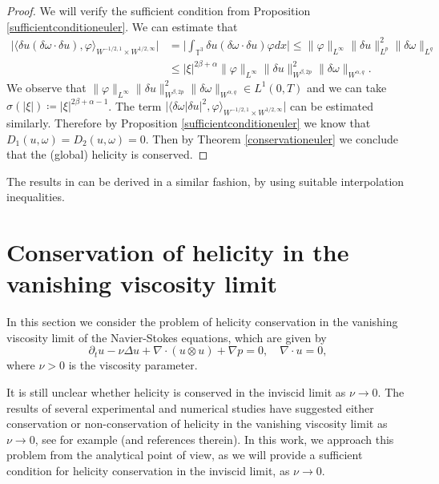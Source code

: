 \documentclass[12pt,a4paper]{article}
\theoremstyle{definition}
\theoremstyle{remark}
\numberwithin{equation}{section}
\begin{document}
\begin{proof}
We will verify the sufficient condition from Proposition \ref{sufficientconditioneuler}. We can estimate that
\begin{align*}
\lvert \langle \delta u (\delta \omega \cdot \delta u), \varphi \rangle_{W^{-1/2,1} \times W^{1/2,\infty}} \rvert &= \bigg\lvert \int_{\mathbb{T}^3} \delta u (\delta \omega \cdot \delta u) \varphi dx \bigg\rvert \leq \lVert \varphi \rVert_{L^\infty} \lVert \delta u \rVert_{L^p}^2 \lVert \delta \omega \rVert_{L^q}  \\
&\leq \lvert \xi \rvert^{2 \beta + \alpha } \lVert \varphi \rVert_{L^\infty} \lVert \delta u \rVert_{W^{\beta,2 p}}^2 \lVert \delta \omega \rVert_{W^{\alpha,q}}.
\end{align*}
We observe that $\lVert \varphi \rVert_{L^\infty} \lVert \delta u \rVert_{W^{\beta,2 p}}^2 \lVert \delta \omega \rVert_{W^{\alpha,q}} \in L^1 (0,T)$ and we can take $\sigma (\lvert \xi \rvert) \coloneqq \lvert \xi \rvert^{2 \beta + \alpha - 1}$. The term $\lvert \langle \delta \omega \lvert \delta u \rvert^2 , \varphi \rangle_{W^{-1/2,1} \times W^{1/2,\infty}} \rvert$ can be estimated similarly. Therefore by Proposition \ref{sufficientconditioneuler} we know that $D_1 (u, \omega) = D_2 (u, \omega) = 0$. Then by Theorem \ref{conservationeuler} we conclude that the (global) helicity is conserved.
\end{proof}
The results in \cite{wangcompressible,wanghelicity} can be derived in a similar fashion, by using suitable interpolation inequalities.

\section{Conservation of helicity in the vanishing viscosity limit} \label{inviscidlimitsection}
In this section we consider the problem of helicity conservation in the vanishing viscosity limit of the Navier-Stokes equations, which are given by
\begin{equation}
\partial_t u - \nu \Delta u + \nabla \cdot (u \otimes u) + \nabla p = 0, \quad \nabla \cdot u = 0,
\end{equation}
where $\nu > 0$ is the viscosity parameter. 

It is still unclear whether helicity is conserved in the inviscid limit as $\nu \rightarrow 0$. The results of several experimental and numerical studies have suggested either conservation or non-conservation of helicity in the vanishing viscosity limit as $\nu \rightarrow 0$, see for example \cite{yaoreview,meng} (and references therein). In this work, we approach this problem from the analytical point of view, as we will provide a sufficient condition for helicity conservation in the inviscid limit, as $\nu \rightarrow 0$. 
\end{document}
